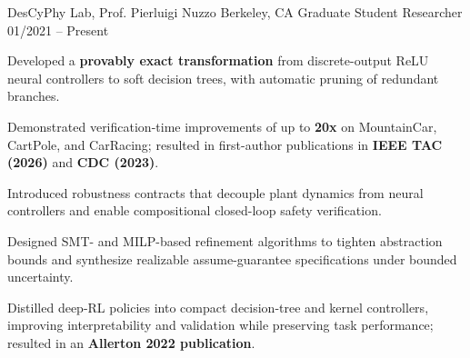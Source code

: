 \vspace{1.5mm}


\begin{cventries}

    \setlength\leftmargini{4ex}
    \renewcommand{\labelitemi}{---}
    \setlength\leftmarginii{1ex}
    \renewcommand{\labelitemii}{$\circ$}
    \setlength\cventrywidth{2.5cm}

\cventry
{DesCyPhy Lab, Prof. Pierluigi Nuzzo}
{Berkeley, CA}
{Graduate Student Researcher}
{01/2021 -- Present}
{
\vspace{-3.5mm}
\item {}
\begin{cvitems}
\item Developed a \textbf{provably exact transformation} from discrete-output ReLU neural controllers to soft decision trees, with automatic pruning of redundant branches.
\item Demonstrated verification-time improvements of up to \textbf{20x} on MountainCar, CartPole, and CarRacing; resulted in first-author publications in \textbf{IEEE TAC (2026)} and \textbf{CDC (2023)}.
\end{cvitems}
\vspace{1.8mm}
\item {}
\begin{cvitems}
\item Introduced robustness contracts that decouple plant dynamics from neural controllers and enable compositional closed-loop safety verification.
\item Designed SMT- and MILP-based refinement algorithms to tighten abstraction bounds and synthesize realizable assume-guarantee specifications under bounded uncertainty.
\end{cvitems}
\vspace{1.8mm}
\item {}
\begin{cvitems}
\item Distilled deep-RL policies into compact decision-tree and kernel controllers, improving interpretability and validation while preserving task performance; resulted in an \textbf{Allerton 2022 publication}.
\end{cvitems}
}


\end{cventries}
